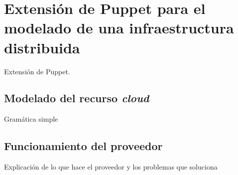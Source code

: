 \chapter{Extensión de Puppet para el modelado de una infraestructura distribuida}
\label{cap:trabajo}


Extensión de Puppet.


\section{Modelado del recurso \emph{cloud}}

Gramática simple


\section{Funcionamiento del proveedor}

Explicación de lo que hace el proveedor y los problemas que soluciona

